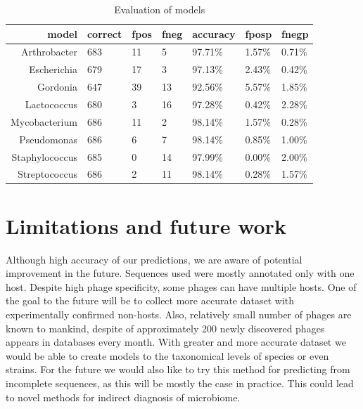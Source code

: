 \begin{table}
 \centering
   \begin{tabular}{ r l l l l l l }
        \hline
        model & correct & fpos & fneg & accuracy & fposp & fnegp \\
        \hline
        Arthrobacter & 683 & 11 & 5  & 97.71\% & 1.57\% & 0.71\% \\
        Escherichia & 679 & 17 & 3  & 97.13\% & 2.43\% & 0.42\% \\
        Gordonia & 647 & 39 & 13 & 92.56\% & 5.57\% & 1.85\% \\
        Lactococcus & 680 & 3  & 16 & 97.28\% & 0.42\% & 2.28\% \\
        Mycobacterium & 686 & 11 & 2  & 98.14\% & 1.57\% & 0.28\% \\
        Pseudomonas & 686 & 6  & 7  & 98.14\% & 0.85\% & 1.00\% \\
        Staphylococcus & 685 & 0  & 14 & 97.99\% & 0.00\% & 2.00\% \\
        Streptococcus & 686 & 2  & 11 & 98.14\% & 0.28\% & 1.57\% \\
        \end{tabular}
        \bigskip
   \caption{Evaluation of models}
   \label{tab:models}
\end{table}

\section{Limitations and future work}
Although high accuracy of our predictions, we are aware of potential improvement in the future.
Sequences used were mostly annotated only with one host. 
Despite high phage specificity, some phages can have multiple hosts.
One of the goal to the future will be to collect more accurate dataset with experimentally confirmed non-hosts.
Also, relatively small number of phages are known to mankind, despite of approximately 200 newly discovered phages appears in databases every month. 
With greater and more accurate dataset we would be able to create models to the taxonomical levels of species or even strains.
For the future we would also like to try this method for predicting from incomplete sequences, as this will be mostly the case in practice.
This could lead to novel methods for indirect diagnosis of microbiome.

